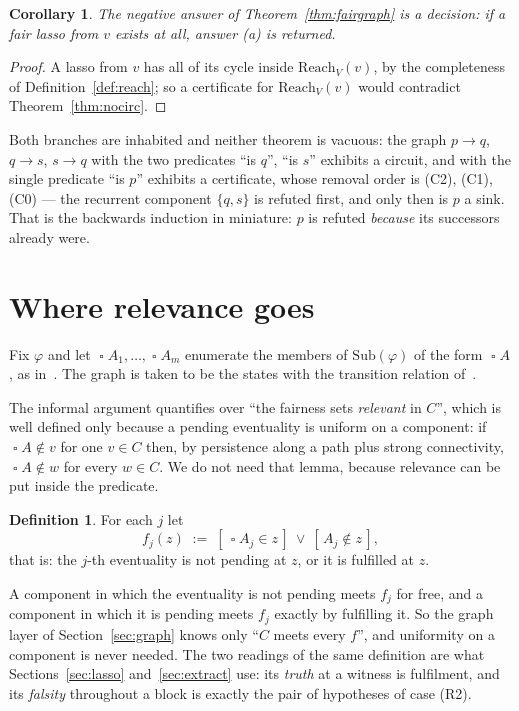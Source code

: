 \documentclass[11pt,a4paper]{article}
\newtheorem{corollary}[theorem]{Corollary}
\theoremstyle{definition}
\newtheorem{definition}[theorem]{Definition}
\newcommand{\Always}{\mathop{\square}}
\newcommand{\Sub}{\mathrm{Sub}}
\newcommand{\Reach}{\mathrm{Reach}}
\begin{document}
\begin{corollary}\label{cor:decision}
The negative answer of Theorem~\ref{thm:fairgraph} is a decision: if a fair
lasso from $v$ exists at all, answer (a) is returned.
\end{corollary}

\begin{proof}
A lasso from $v$ has all of its cycle inside $\Reach_V(v)$, by the completeness
of Definition~\ref{def:reach}; so a certificate for $\Reach_V(v)$ would
contradict Theorem~\ref{thm:nocirc}.
\end{proof}

Both branches are inhabited and neither theorem is vacuous: the graph
$p\to q$, $q\to s$, $s\to q$ with the two predicates ``is $q$'', ``is $s$''
exhibits a circuit, and with the single predicate ``is $p$'' exhibits a
certificate, whose removal order is (C2), (C1), (C0) --- the recurrent
component $\{q,s\}$ is refuted first, and only then is $p$ a sink.  That is the
backwards induction in miniature: $p$ is refuted \emph{because} its successors
already were.

\section{Where relevance goes}\label{sec:evpred}

Fix $\varphi$ and let $\Always A_1,\dots,\Always A_m$ enumerate the members of
$\Sub(\varphi)$ of the form $\Always A$, as in~\cite{m4}.  The graph is taken
to be the states with the transition relation of~\cite[Def.~2.3]{m4}.

The informal argument quantifies over ``the fairness sets \emph{relevant} in
$C$'', which is well defined only because a pending eventuality is uniform on a
component: if $\Always A\notin v$ for one $v\in C$ then, by persistence along a
path plus strong connectivity, $\Always A\notin w$ for every $w\in C$.  We do
not need that lemma, because relevance can be put inside the predicate.

\begin{definition}\label{def:evpred}
For each $j$ let
\[
  f_j(z) \;:=\; [\,\Always A_j\in z\,]\ \vee\ [\,A_j\notin z\,],
\]
that is: the $j$-th eventuality is not pending at $z$, or it is fulfilled at
$z$.
\end{definition}

A component in which the eventuality is not pending meets $f_j$ for free, and a
component in which it is pending meets $f_j$ exactly by fulfilling it.  So the
graph layer of Section~\ref{sec:graph} knows only ``$C$ meets every $f$'', and
uniformity on a component is never needed.  The two readings of the same
definition are what Sections~\ref{sec:lasso} and~\ref{sec:extract} use: its
\emph{truth} at a witness is fulfilment, and its \emph{falsity} throughout a
block is exactly the pair of hypotheses of case (R2).
\end{document}
